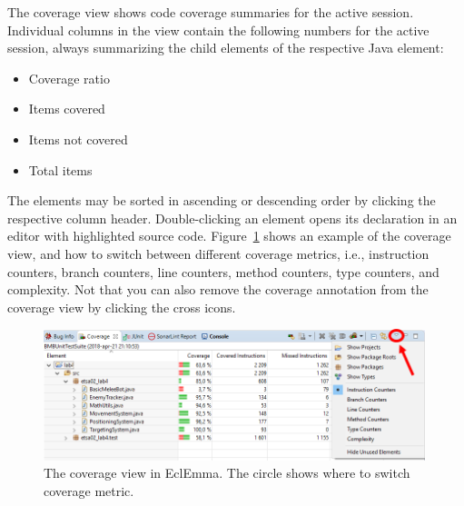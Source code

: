 \documentclass{scrreprt}
\begin{document}
The coverage view shows code coverage summaries for the active session. Individual columns in the view contain the following numbers for the active session, always summarizing the child elements of the respective Java element:

\begin{itemize}
\item Coverage ratio
\item Items covered
\item Items not covered
\item Total items
\end{itemize}

The elements may be sorted in ascending or descending order by clicking the respective column header. Double-clicking an element opens its declaration in an editor with highlighted source code. Figure~\ref{fig:eclemma} shows an example of the coverage view, and how to switch between different coverage metrics, i.e., instruction counters, branch counters, line counters, method counters, type counters, and complexity. Not that you can also remove the coverage annotation from the coverage view by clicking the cross icons.

\begin{figure}
\centering
\includegraphics[width=0.99\textwidth]{figures/EclEmma.png}
\caption{The coverage view in EclEmma. The circle shows where to switch coverage metric.}
\label{fig:eclemma}
\end{figure}
\end{document}
